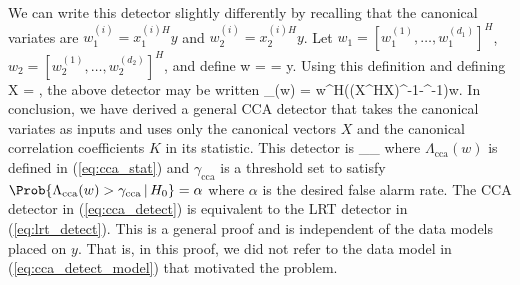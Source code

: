 We can write this detector slightly differently by recalling that the
canonical variates are $w_1^{(i)}=x_1^{(i)H}y$ and $w_2^{(i)}=x_2^{(i)H}y$. Let
$w_1=\left[w_1^{(1)},\dots,w_1^{(d_1)}\right]^H$,
$w_2=\left[w_2^{(1)},\dots,w_2^{(d_2)}\right]^H$, and define
\be 
w =  =
\left[\begin{array}{cc}X_1^H & 0 \\ 0 & X_2^H\end{array}\right]y. 
\ee
Using this definition and defining
\be
X = \left[\begin{array}{cc}X_1 & 0 \\ 0 & X_2\end{array}\right],
\ee
the above detector may be written
\beq\label{eq:cca_stat}
\Lambda_{}(w) = w^H\left(\left(X^HX\right)^{-1}-\left[\begin{array}{cc}
    I_{d_1} & K \\ K^H & I_{d_2}
\end{array}\right]^{-1}\right)w.
\eeq
In conclusion, we have derived a general CCA detector that takes the canonical variates as
inputs and uses only the canonical vectors $X$ and the canonical correlation coefficients
$K$ in its statistic. This detector is
\beq\label{eq:cca_detect}
\Lambda_{}\detgtrless\gamma_{}
\eeq
where $\Lambda_{\text{cca}}(w)$ is defined in (\ref{eq:cca_stat}) and
$\gamma_{\text{cca}}$ is a threshold set to satisfy\\
$\Prob{\Lambda_{\text{cca}}(w)>\gamma_{\text{cca}}\,|\,H_0}=\alpha$ where $\alpha$ is the
desired false alarm rate. The CCA detector in (\ref{eq:cca_detect}) is equivalent to the
LRT detector in (\ref{eq:lrt_detect}). This is a general proof and is independent of the
data models placed on $y$. That is, in this proof, we did not refer to the data model in
(\ref{eq:cca_detect_model}) that motivated the problem.


